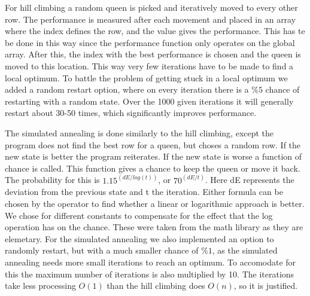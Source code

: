 \documentclass{article}
\begin{document}
For hill climbing a random queen is picked and iteratively moved to every other row. The performance is measured after each movement and placed in an array where the index defines the row, and the value gives the performance. This has te be done in this way since the performance function only operates on the global array. After this, the index with the best performance is chosen and the queen is moved to this location. This way very few iterations have to be made to find a local optimum. To battle the problem of getting stuck in a local optimum we added a random restart option, where on every iteration there is a $\%5$ chance of restarting with a random state. Over the 1000 given iterations it will generally restart about 30-50 times, which significantly improves performance. 

The simulated annealing is done similarly to the hill climbing, except the program does not find the best row for a queen, but choses a random row. If the new state is better the program reiterates. If the new state is worse a function of chance is called. This function gives a chance to keep the queen or move it back. The probability for this is $1.15^(dE / log(t))$, or $70^(dE/t)$. Here dE represents the deviation from the previous state and t the iteration. Either formula can be chosen by the operator to find whether a linear or logarithmic approach is better. We chose for different constants to compensate for the effect that the log operation has on the chance. These were taken from the math library as they are elemetary. For the simulated annealing we also implemented an option to randomly restart, but with a much smaller chance of $\%1$, as the simulated annealing needs more small iterations to reach an optimum. To accomodate for this the maximum number of iterations is also multiplied by 10. The iterations take less processing $O(1)$ than the hill climbing does $O(n)$, so it is justified.
\end{document}
